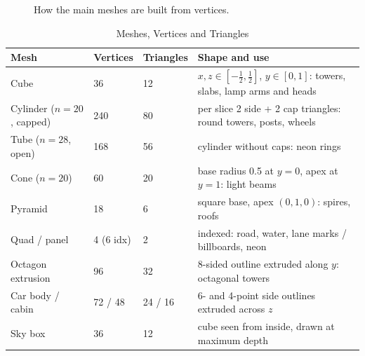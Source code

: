 \documentclass[12pt, a4paper]{report}
\begin{document}
\begin{figure}[!htbp]
{}
  \caption{How the main meshes are built from vertices.}
  \label{fig:3.2}
\end{figure}

\begin{table}[!htbp]
  \caption{Meshes, Vertices and Triangles}
  \label{tab:3.1g}
  \centering
  {\fontsize{10}{12.5}\selectfont
    \begin{tabular}{|p{1.35in}|p{0.6in}|p{0.6in}|p{2.85in}|}
      \hline
      \textbf{Mesh} & \textbf{Vertices} & \textbf{Triangles} & \textbf{Shape and use} \\
      \hline
      Cube & 36 & 12 & $x,z\in[-\frac12,\frac12]$, $y\in[0,1]$: towers, slabs, lamp arms and heads \\
      \hline
      Cylinder ($n=20$, capped) & 240 & 80 & per slice 2 side + 2 cap triangles: round towers, posts, wheels \\
      \hline
      Tube ($n=28$, open) & 168 & 56 & cylinder without caps: neon rings \\
      \hline
      Cone ($n=20$) & 60 & 20 & base radius 0.5 at $y=0$, apex at $y=1$: light beams \\
      \hline
      Pyramid & 18 & 6 & square base, apex $(0,1,0)$: spires, roofs \\
      \hline
      Quad / panel & 4 (6 idx) & 2 & indexed: road, water, lane marks / billboards, neon \\
      \hline
      Octagon extrusion & 96 & 32 & 8-sided outline extruded along $y$: octagonal towers \\
      \hline
      Car body / cabin & 72 / 48 & 24 / 16 & 6- and 4-point side outlines extruded across $z$ \\
      \hline
      Sky box & 36 & 12 & cube seen from inside, drawn at maximum depth \\
      \hline
    \end{tabular}
  }
\end{table}
\end{document}
